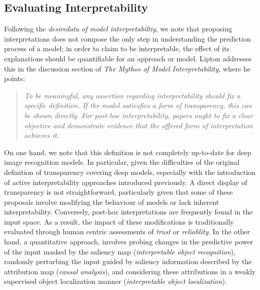\subsection{Evaluating Interpretability}
\label{rel:sub_evl}
Following the \emph{desiredata of model interpretabiltiy}, we note that proposing interpretations 
does not compose the only step in understanding the prediction process of a model; in order to 
claim to be interpretable, the effect of its explanations should be quantifiable for an approach 
or model. Lipton addresses this in the discussion section of \emph{The Mythos of Model 
Interpretability}, where he points: 
\begin{quote}
	\emph{To be meaningful, any assertion regarding interpretability should fix a specific 
	definition. If the model satiesfies a form of transparency, this can be shown directly. 
	For post-hoc interpretability, papers ought to fix a clear objective and demonstrate evidence 
	that the offered form of interpretation achieves it.}
\end{quote}
On one hand, we note that this definition is not completely up-to-date for deep image recognition 
models. In particular, given the difficulties of the original definition of transparency covering 
deep models, especially with the introduction of active interpretability approaches introduced 
previously. A direct display of transparency is not straightforward, particularly given that some 
of these proposals involve modifying the behaviour of models or lack inherent interpretability. 
Conversely, post-hoc interpretations are frequently found in the input space. As a result, 
the impact of these modifications is traditionally evaluated through human centric assessments of 
\emph{trust} or \emph{reliablity}. In the other hand, a quantitative approach, involves probing changes 
in the predictive power of the input masked by the saliency map (\emph{interpretable object 
recognition}), randomly perturbing the input guided by saliency information described by the 
attribution map (\emph{causal analysis}), and considering these attributions in a weakly supervised 
object localization manner (\emph{interpretable object localization}).

